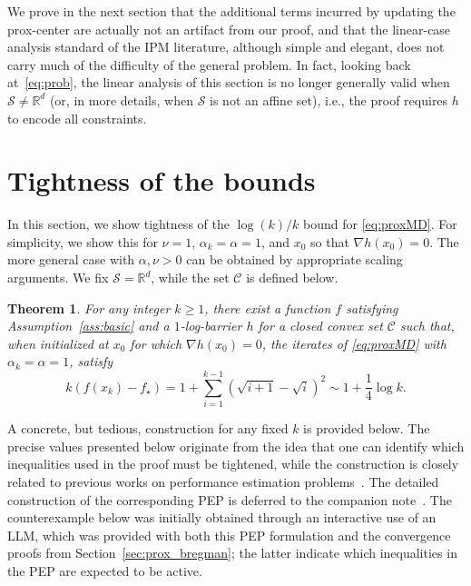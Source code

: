 \documentclass[a4paper]{article}
\renewcommand{\geq}{\geqslant}
\newcommand{\CC}{\mathcal{C}}
\renewcommand{\SS}{\mathcal{S}}
\newcommand{\R}{\mathbb{R}}
\newtheorem{theorem}{Theorem}
\begin{document}
We prove in the next section that the additional terms incurred by updating the prox-center are actually not an artifact from our proof, and that the linear-case analysis standard of the IPM literature, although simple and elegant, does not carry much of the difficulty of the general problem.
In fact, looking back at~\eqref{eq:prob}, the linear analysis of this section is no longer generally valid when $\SS\neq \R^d$ (or, in more details, when $\SS$ is not an affine set), i.e., the proof  requires $h$ to encode all constraints.

\section{Tightness of the  bounds}\label{sec:tight_bounds}

In this section, we show tightness of the $\log(k)/k$ bound for \eqref{eq:proxMD}. For simplicity, we show this for  $\nu=1$, $\alpha_k=\alpha=1$, and $x_0$ so that $\nabla h(x_0)=0$. The more general case with $\alpha,\nu>0$ can be obtained by appropriate scaling arguments. We fix $\SS = \R^d$, while the set $\CC$ is defined below.
\begin{theorem}\label{thm:tight_prox_MD}
For any integer $k\geq 1$, there exist a function $f$ satisfying
Assumption~\ref{ass:basic} and a $1$-log-barrier $h$ for a closed convex set $\CC$ such that, when initialized at  $x_0$ for which $\nabla h(x_0)=0$, the iterates of \eqref{eq:proxMD} with $\alpha_k=\alpha=1$,  satisfy
  \begin{equation}\label{eq:tight_WC}
  k (f(x_k)-f_\star) = 1+\sum_{i=1}^{k-1}(\sqrt{i+1}-\sqrt{i})^2\sim 1 + \frac 1 4 \log k.
\end{equation}
\end{theorem}
A concrete, but tedious, construction for any fixed $k$ is provided below.
The precise values presented below originate from the idea that one can identify which inequalities used in the proof must be tightened, while the construction is closely related to previous works on performance estimation problems~\cite{drori2014performance,taylor2017smooth,dragomir2022optimal}.
The detailed construction of the corresponding PEP is deferred to the companion note~\cite{demarchi2026mirrorpep}.
The counterexample below was initially obtained through an interactive use of an LLM, which was provided with both this PEP formulation and the convergence proofs from Section~\ref{sec:prox_bregman}; the latter indicate which inequalities in the PEP are expected to be active.
\end{document}
